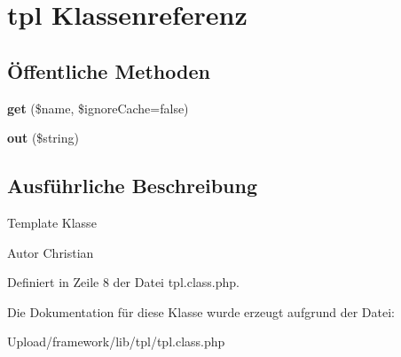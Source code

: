 \hypertarget{classtpl}{}\section{tpl Klassenreferenz}
\label{classtpl}
\subsection*{Öffentliche Methoden}
\begin{DoxyCompactItemize}
\item 
\mbox{\label{classtpl_a2af09e9663b83e65b24448c90ed10f7b}} 
{\bfseries get} (\$name, \$ignore\+Cache=false)
\item 
\mbox{\label{classtpl_a6b48138b82b7f25dca0c073aaaf41aaa}} 
{\bfseries out} (\$string)
\end{DoxyCompactItemize}


\subsection{Ausführliche Beschreibung}
Template Klasse \begin{DoxyAuthor}{Autor}
Christian 
\end{DoxyAuthor}


Definiert in Zeile 8 der Datei tpl.\+class.\+php.



Die Dokumentation für diese Klasse wurde erzeugt aufgrund der Datei\+:\begin{DoxyCompactItemize}
\item 
Upload/framework/lib/tpl/tpl.\+class.\+php\end{DoxyCompactItemize}

